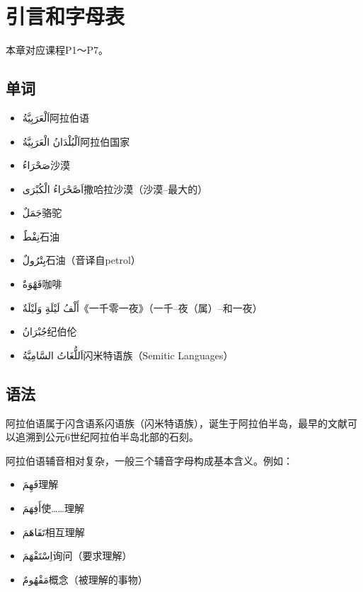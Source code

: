 \chapter{引言和字母表}

本章对应课程P1～P7。

\section{单词}

\begin{itemize}
    \item \ac{اَلْعَرَبِيَّةُ}{阿拉伯语}
    \item \ac{اَلْبُلْدَانُ الْعَرَبِيَّةُ}{阿拉伯国家}
    \item \ac{صَحْرَاءُ}{沙漠}
    \item \ac{اَصَّحْرَاءُ الْكُبْرَى}{撒哈拉沙漠（沙漠--最大的）}
    \item \ac{جَمَلٌ}{骆驼}
    \item \ac{نِفْطٌ}{石油}
    \item \ac{بِتْرُولٌ}{石油（音译自petrol）}
    \item \ac{قَهْوَةٌ}{咖啡}
    \item \ac{أَلْفُ لَيْلَةِِ وَلَيْلَةٌ}{《一千零一夜》（一千--夜（属）--和一夜）}
    \item \ac{جُبْرَانُ}{纪伯伦}
    \item \ac{اَللُّغَاتُ السَّامِيَّةُ}{闪米特语族（Semitic Languages）}

\end{itemize}

\section{语法}

阿拉伯语属于闪含语系闪语族（闪米特语族），诞生于阿拉伯半岛，最早的文献可以追溯到公元6世纪阿拉伯半岛北部的石刻。

阿拉伯语辅音相对复杂，一般三个辅音字母构成基本含义。例如：

\begin{itemize}
    \item \ac{فَهِمَ}{理解}
    \item \ac{أَفِهَمَ}{使……理解}
    \item \ac{تَفَاهَمَ}{相互理解}
    \item \ac{اِسْتَفْهَمَ}{询问（要求理解）}
    \item \ac{مَفْهُومٌ}{概念（被理解的事物）}
\end{itemize}

